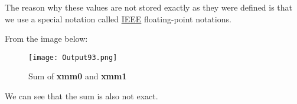 \documentclass{article}
\begin{document}
The reason why these values are not stored exactly as they were defined is that we use a special notation called \href{https://staffwww.fullcoll.edu/aclifton/cs241/lecture-floating-point-simd.html}{IEEE} floating-point notations.

From the image below:
\begin{figure}[h]
	\centering
	\texttt{[image: Output93.png]}
	\caption{Sum of \textbf{xmm0} and \textbf{xmm1}}
	\label{fig:fig4}
\end{figure}

We can see that the sum is also not exact.
\end{document}
